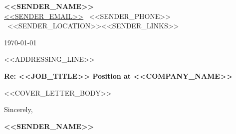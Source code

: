\documentclass[a4paper,10pt]{article}
\begin{document}
\noindent
{\Large \textbf{<<SENDER_NAME>>}} \\
\small
\href{mailto:<<SENDER_EMAIL>>}{<<SENDER_EMAIL>>} \textbar\
<<SENDER_PHONE>> \textbar\
<<SENDER_LOCATION>><<SENDER_LINKS>>

\vspace{0.5em}

\normalsize
\today

\vspace{0.8em}

<<ADDRESSING_LINE>>

\vspace{0.5em}

\textbf{Re: <<JOB_TITLE>> Position at <<COMPANY_NAME>>}

\vspace{0.8em}

<<COVER_LETTER_BODY>>

\vspace{1.5em}

Sincerely,

\vspace{2em}

\textbf{<<SENDER_NAME>>}
\end{document}
